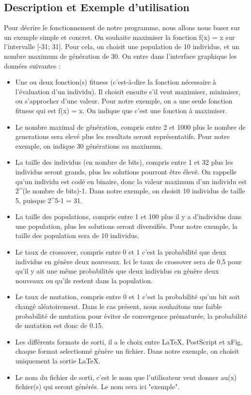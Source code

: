 \documentclass[a4paper,11pt]{article}
\begin{document}
		\subsection{Description et Exemple d’utilisation}
			Pour décrire le fonctionnement de notre programme, nous allons nous baser sur un exemple simple et concret.
			On souhaite maximiser la fonction f(x) = x sur l'intervalle [-31; 31].
			Pour cela, on choisit une population de 10 individus, et un nombre maximum de génération de 30.
			On entre dans l’interface graphique les données suivantes :\\
				\begin{itemize}
					\item	Une ou deux fonction(s) fitness (c’est-à-dire la fonction nécessaire à l’évaluation d’un individu). 
							Il choisit ensuite s’il veut maximiser, minimiser, ou s’approcher d’une valeur. 
							Pour notre exemple, on a une seule fonction fitness qui est f(x) = x. On indique que c’est une fonction à maximiser.
					\item 	Le nombre maximal de génération, compris entre 2 et 1000 plus le nombre de generations sera elevé plus les resultats seront représentatifs. 
							Pour notre exemple, on indique 30 générations au maximum.		
					\item	La taille des individus (en nombre de bits), compris entre 1 et 32 plus les individus seront grands, plus les solutions pourront être élevé.
							On rappelle qu’un individu est codé en binaire, donc la valeur maximum d’un individu est 2\^{}(le nombre de bits)-1.
							Dans notre exemple, on choisit 10 individus de taille 5, puisque 2\^{}5-1 = 31. 
					\item	La taille des populations, compris entre 1 et 100 plus il y a d'individus dans une population, plus les solutions seront diversifiés.
							Pour notre exemple, la taille des population sera de 10 individus.
					\item	Le taux de crossover, compris entre 0 et 1 c'est la probabilité que deux individus en génère deux nouveaux.
							Ici le taux de crossover sera de 0,5 pour qu'il y ait une même probabilités que deux individus en génère deux nouveaux ou qu'ils restent dans la population.
					\item	Le taux de mutation, compris entre 0 et 1 c'est la probabilité qu'un bit soit changé aléatoirement.
							Dans le cas présent, nous souhaitons une faible probabilité de mutation pour éviter de convergence prématurée, la probabilité de mutation est donc de 0.15.
					\item	Les différents formats de sorti, il a le choix entre LaTeX, PostScript et xFig, chaque format selectionné génère un fichier.
							Dans notre exemple, on choisit uniquement la sortie LaTeX.
					\item	Le nom du fichier de sorti, c'est le nom que l'utilisateur veut donner au(x) fichier(s) qui seront générés.
							Le nom sera ici "exemple".\\
					\end{itemize}
\end{document}
